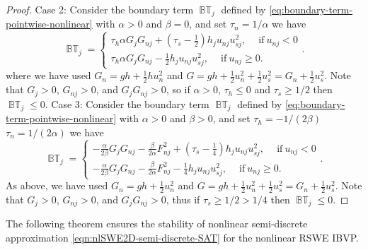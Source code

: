 \documentclass{article}
\numberwithin{equation}{section}
\theoremstyle{definition}
\begin{document}
\begin{proof}
\noindent
Case 2:
    Consider the boundary term  $\operatorname{\mathbb{BT}}_j$ defined by \eqref{eq:boundary-term-pointwise-nonlinear} with $\alpha> 0$ and $\beta =0 $, and set $\tau_n = 1/\alpha$
     we have
     $$
      \operatorname{\mathbb{BT}}_j =
\begin{cases}
     \tau_h \alpha G_{j}  G_{nj}  + 
    \left(\tau_s -\frac{1}{2}\right)h_ju_{nj}u_{sj}^2 , \quad \ \text{if} \ u_{nj} < 0\\
%     
 \tau_h \alpha G_{j}  G_{nj}  
     -\frac{1}{2}h_ju_{nj}u_{sj}^2, \quad \ \text{if} \ u_{nj} \ge  0.
     \end{cases}.
     $$
where we have used
$
G_n = gh + \frac{1}{2}hu_n^2 
$
and 
$G = gh + \frac{1}{2}u_n^2 + \frac{1}{2}u_s^2  = G_n + \frac{1}{2}u_s^2 $.
Note that $G_{j} >0$,  $G_{nj} >0$, and $G_{j}  G_{nj} >0 $, so if $\alpha >0$, $\tau_h \le 0$ and $\tau_s \ge 1/2$ then $\operatorname{\mathbb{BT}}_j \le 0$.
\newline
\newline
\noindent
Case 3:
    Consider the boundary term  $\operatorname{\mathbb{BT}}_j$ defined by \eqref{eq:boundary-term-pointwise-nonlinear} with $\alpha> 0$ and $\beta >0 $, and set $\tau_h = -1/(2\beta)$ $\tau_n = 1/(2\alpha)$
     we have
     $$
      \operatorname{\mathbb{BT}}_j =
\begin{cases}
      -\frac{\alpha}{2\beta} G_{j}  G_{nj}  - \frac{\beta}{2\alpha} F_{nj}^2 + 
    \left(\tau_s -\frac{1}{4}\right)h_ju_{nj}u_{sj}^2 , \quad \ \text{if} \ u_{nj} < 0\\
%     
-\frac{\alpha}{2\beta} G_{j}  G_{nj}  - \frac{\beta}{2\alpha} F_{nj}^2  
     -\frac{1}{4}h_ju_{nj}u_{sj}^2, \quad \ \text{if} \ u_{nj} \ge  0.
     \end{cases}.
     $$
As above, we have used
$
G_n = gh + \frac{1}{2}u_n^2 
$
and 
$G = gh + \frac{1}{2}u_n^2 + \frac{1}{2}u_s^2  = G_n + \frac{1}{2}u_s^2 $.
Note that $G_{j} >0$,  $G_{nj} >0$, and $G_{j}  G_{nj} >0 $, thus if  $\tau_s \ge 1/2 > 1/4$ then $\operatorname{\mathbb{BT}}_j \le 0$.
\end{proof}
The following theorem ensures the stability of nonlinear semi-discrete approximation \eqref{eqn:nlSWE2D-semi-discrete-SAT} for the nonlinear RSWE IBVP.
\end{document}
